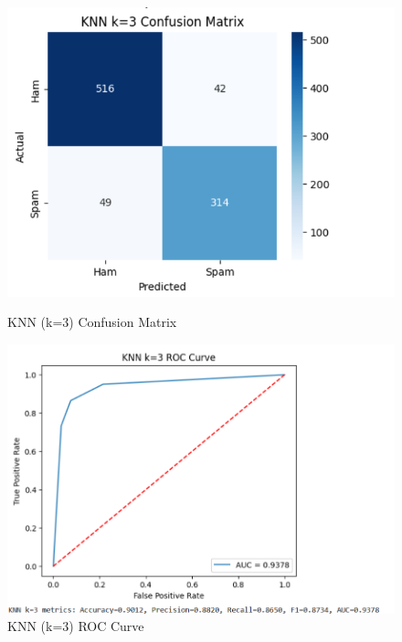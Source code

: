 \documentclass[12pt]{article}
\begin{document}
\begin{figure}[H]
\centering
\begin{minipage}{0.45\textwidth}
\centering
\includegraphics[width=\linewidth]{14.png}
\caption{KNN (k=3) Confusion Matrix}
\end{minipage}
\hfill
\begin{minipage}{0.45\textwidth}
\centering
\includegraphics[width=\linewidth]{15.png}
\caption{KNN (k=3) ROC Curve}
\end{minipage}
\end{figure}
\end{document}

